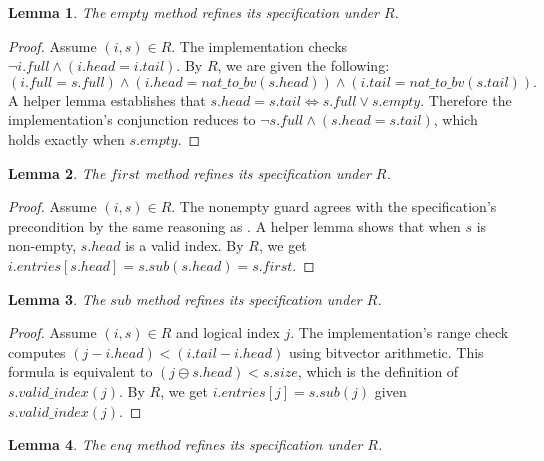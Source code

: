 \documentclass[fontset=fira-newtxsf]{mitthesis}
\theoremstyle{definition}
\theoremstyle{plain}
\newtheorem{lemma}{Lemma}[section]
\begin{document}
\begin{lemma} \label{lem:rb-empty}
The $\mathit{empty}$ method refines its specification under $R$.
\end{lemma}

\begin{proof}[Proof]
Assume $(i, s) \in R$.
The implementation checks $\neg i.\mathit{full} \wedge (i.\mathit{head} = i.\mathit{tail})$.
By $R$, we are given the following:
\[
(i.\mathit{full} = s.\mathit{full}) \land (i.\mathit{head} = \mathit{nat\_to\_bv}(s.\mathit{head})) \land (i.\mathit{tail} = \mathit{nat\_to\_bv}(s.\mathit{tail})).
\]
A helper lemma establishes that $s.\mathit{head} = s.\mathit{tail} \iff s.\mathit{full} \lor s.\mathit{empty}$.
Therefore the implementation's conjunction reduces to $\neg s.\mathit{full} \wedge (s.\mathit{head} = s.\mathit{tail})$, which holds exactly when $s.\mathit{empty}$.
\end{proof}

\begin{lemma} \label{lem:rb-first}
The $\mathit{first}$ method refines its specification under $R$.
\end{lemma}

\begin{proof}[Proof]
Assume $(i, s) \in R$.
The nonempty guard agrees with the specification's precondition by the same reasoning as .
A helper lemma shows that when $s$ is non-empty, $s.\mathit{head}$ is a valid index.
By $R$, we get $i.\mathit{entries}[s.\mathit{head}] = s.\mathit{sub}(s.\mathit{head}) = s.\mathit{first}$.
\end{proof}

\begin{lemma} \label{lem:rb-sub}
The $\mathit{sub}$ method refines its specification under $R$.
\end{lemma}

\begin{proof}[Proof]
Assume $(i, s) \in R$ and logical index $j$.
The implementation's range check computes $(j - i.\mathit{head}) < (i.\mathit{tail} - i.\mathit{head})$ using bitvector arithmetic.
This formula is equivalent to $(j \ominus s.\mathit{head}) < s.\mathit{size}$, which is the definition of $s.\mathit{valid\_index}(j)$.
By $R$, we get $i.\mathit{entries}[j] = s.\mathit{sub}(j)$ given $s.\mathit{valid\_index}(j)$.
\end{proof}

\begin{lemma} \label{lem:rb-enq}
The $\mathit{enq}$ method refines its specification under $R$.
\end{lemma}
\end{document}

